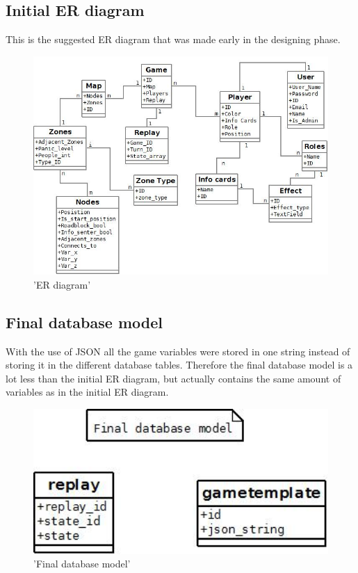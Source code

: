 \subsection{Initial ER diagram}
This is the suggested ER diagram that was made early in the designing phase.
\begin{figure}[H]
  \centering
    \includegraphics[width=1.0\textwidth]{img/erdiagram.jpeg}
  \caption{'ER diagram'} 
  \label{fig:erdiagram}
\end{figure}

\subsection{Final database model}
With the use of JSON all the game variables were stored in one string instead of storing it in the different database tables. Therefore the final database model is a lot less than the initial ER diagram, but actually contains the same amount of variables as in the initial ER diagram.	
\begin{figure}[H]
  \centering
    \includegraphics[width=1.0\textwidth]{img/finaldatabase.jpeg}
  \caption{'Final database model'} 
  \label{fig:final_erdiagram}
\end{figure}

